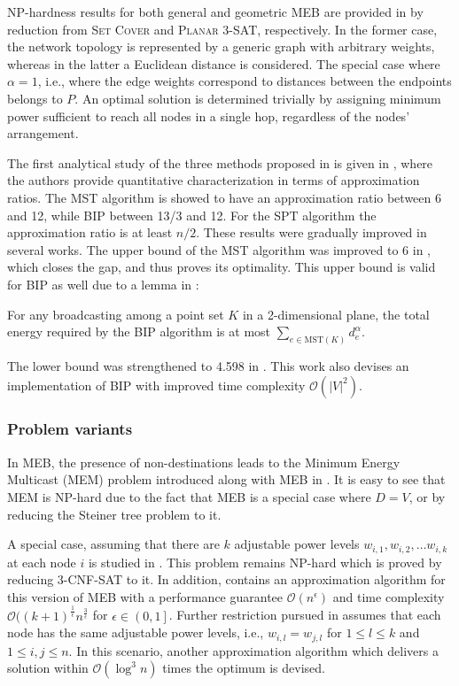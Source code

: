 NP-hardness results for both general and geometric MEB are provided in \cite{cagalj02} by reduction from \textsc{Set Cover} and \textsc{Planar 3-SAT}, respectively.
In the former case, the network topology is represented by a generic graph with arbitrary weights, whereas in the latter a Euclidean distance is considered.
The special case where $\alpha=1$, i.e., where the edge weights correspond to distances between the endpoints belongs to $P$.
An optimal solution is determined trivially by assigning minimum power sufficient to reach all nodes in a single hop, regardless of the nodes' arrangement.

The first analytical study of the three methods proposed in \cite{wieselthier00} is given in \cite{wan02}, where the authors provide quantitative characterization in terms of approximation ratios.
The MST algorithm is showed to have an approximation ratio between 6 and 12, while BIP between 13/3 and 12.
For the SPT algorithm the approximation ratio is at least $n/2$.
These results were gradually improved in several works. 
The upper bound of the MST algorithm was improved to 6 in \cite{ambuhl05}, which closes the gap, and thus proves its optimality.
This upper bound is valid for BIP as well due to a lemma in \cite{wan02}:
\begin{lemma}
For any broadcasting among a point set $K$ in a 2-dimensional plane, the total energy required by the BIP algorithm is at most $\sum_{e\in \text{MST}(K)}d_e^\alpha$.
\end{lemma}
The lower bound was strengthened to 4.598 in \cite{bauer09}. 
This work also devises an implementation of BIP with improved time complexity $\mathcal{O}(|V|^2)$.

\subsubsection{Problem variants}

In MEB, the presence of non-destinations leads to the Minimum Energy Multicast (MEM) problem introduced along with MEB in \cite{wieselthier00}.
It is easy to see that MEM is NP-hard due to the fact that MEB is a special case where $D=V$, or by reducing the Steiner tree problem to it.

A special case, assuming that there are $k$ adjustable power levels $w_{i,1},w_{i,2},\dots w_{i,k}$ at each node $i$ is studied in \cite{liang02}.
This problem remains NP-hard which is proved by reducing \textsc{3-CNF-SAT} to it.
In addition, \cite{liang02} contains an approximation algorithm for this version of MEB with a performance guarantee $\mathcal{O}(n^\epsilon)$ and 
time complexity $\mathcal{O}((k+1)^{\frac{1}{\epsilon}} n^{\frac{3}{\epsilon}}$ for $\epsilon\in \left(0,1\right]$.
Further restriction pursued in \cite{liang02} assumes that each node has the same adjustable power levels, i.e., $w_{i,l}=w_{j,l}$ for $1\leq l\leq k$ and $1\leq i,j\leq n$.
In this scenario, another approximation algorithm which delivers a solution within $\mathcal{O}(\log^3 n)$ times the optimum is devised.

